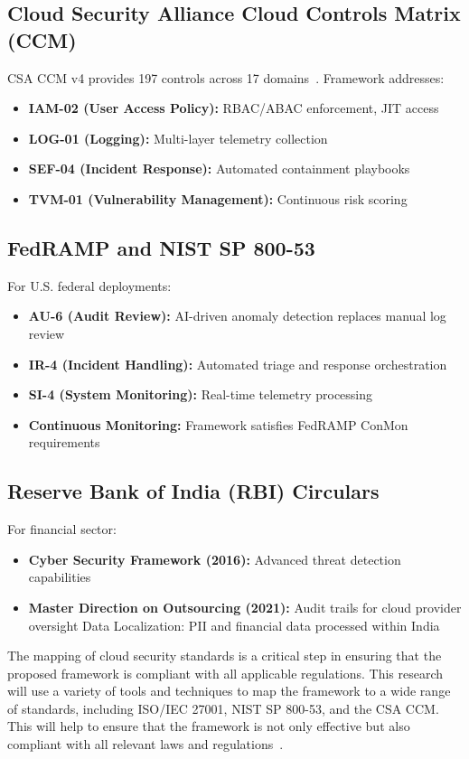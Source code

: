 \subsection{Cloud Security Alliance Cloud Controls Matrix (CCM)}
CSA CCM v4 provides 197 controls across 17 domains~\cite{csa2023ccm}. Framework addresses:
\begin{itemize}
    \item \textbf{IAM-02 (User Access Policy):} RBAC/ABAC enforcement, JIT access
    \item \textbf{LOG-01 (Logging):} Multi-layer telemetry collection
    \item \textbf{SEF-04 (Incident Response):} Automated containment playbooks
    \item \textbf{TVM-01 (Vulnerability Management):} Continuous risk scoring
\end{itemize}

\subsection{FedRAMP and NIST SP 800-53}
For U.S. federal deployments:
\begin{itemize}
    \item \textbf{AU-6 (Audit Review):} AI-driven anomaly detection replaces manual log review
    \item \textbf{IR-4 (Incident Handling):} Automated triage and response orchestration
    \item \textbf{SI-4 (System Monitoring):} Real-time telemetry processing
    \item \textbf{Continuous Monitoring:} Framework satisfies FedRAMP ConMon requirements
\end{itemize}

\subsection{Reserve Bank of India (RBI) Circulars}
For financial sector:
\begin{itemize}
    \item \textbf{Cyber Security Framework (2016):} Advanced threat detection capabilities
    \item \textbf{Master Direction on Outsourcing (2021):} Audit trails for cloud provider oversight
Data Localization: PII and financial data processed within India
\end{itemize}

The mapping of cloud security standards is a critical step in ensuring that the proposed framework is compliant with all applicable regulations. This research will use a variety of tools and techniques to map the framework to a wide range of standards, including ISO/IEC 27001, NIST SP 800-53, and the CSA CCM. This will help to ensure that the framework is not only effective but also compliant with all relevant laws and regulations~\cite{pluralsight2024mapping}.

